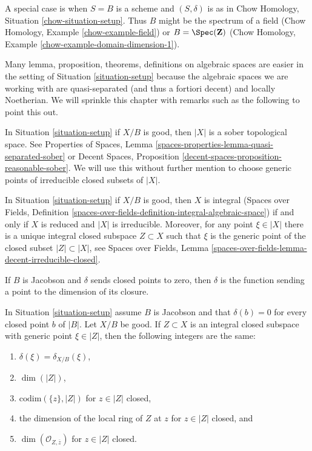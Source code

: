 \noindent
A special case is when $S = B$ is a scheme and $(S, \delta)$ is as in
Chow Homology, Situation \ref{chow-situation-setup}. Thus $B$ might be
the spectrum of a field (Chow Homology, Example \ref{chow-example-field})
or $B = \Spec(\mathbf{Z})$
(Chow Homology, Example \ref{chow-example-domain-dimension-1}).

\medskip\noindent
Many lemma, proposition, theorems, definitions on algebraic spaces
are easier in the setting of Situation \ref{situation-setup} because
the algebraic spaces we are working with are quasi-separated
(and thus a fortiori decent) and locally Noetherian. We will sprinkle
this chapter with remarks such as the following to point this out.

\begin{remark}
\label{remark-sober}
In Situation \ref{situation-setup} if $X/B$ is good, then
$|X|$ is a sober topological space. See
Properties of Spaces, Lemma \ref{spaces-properties-lemma-quasi-separated-sober}
or Decent Spaces, Proposition \ref{decent-spaces-proposition-reasonable-sober}.
We will use this without further mention
to choose generic points of irreducible closed subsets of $|X|$.
\end{remark}

\begin{remark}
\label{remark-integral}
In Situation \ref{situation-setup} if $X/B$ is good, then
$X$ is integral (Spaces over Fields, Definition
\ref{spaces-over-fields-definition-integral-algebraic-space})
if and only if $X$ is reduced and $|X|$ is irreducible.
Moreover, for any point $\xi \in |X|$ there is a unique integral closed
subspace $Z \subset X$ such that $\xi$ is the generic point
of the closed subset $|Z| \subset |X|$, see
Spaces over Fields, Lemma
\ref{spaces-over-fields-lemma-decent-irreducible-closed}.
\end{remark}

\noindent
If $B$ is Jacobson and $\delta$ sends closed points to zero, then $\delta$
is the function sending a point to the dimension of its closure.

\begin{lemma}
\label{lemma-delta-is-dimension}
In Situation \ref{situation-setup} assume $B$ is Jacobson
and that $\delta(b) = 0$ for every closed point $b$ of $|B|$.
Let $X/B$ be good. If $Z \subset X$ is an integral closed subspace
with generic point $\xi \in |Z|$, then the following integers are the same:
\begin{enumerate}
\item $\delta(\xi) = \delta_{X/B}(\xi)$,
\item $\dim(|Z|)$,
\item $\text{codim}(\{z\}, |Z|)$ for $z \in |Z|$ closed,
\item the dimension of the local ring of $Z$ at $z$ for
$z \in |Z|$ closed, and
\item $\dim(\mathcal{O}_{Z, \overline{z}})$ for $z \in |Z|$ closed.
\end{enumerate}
\end{lemma}

